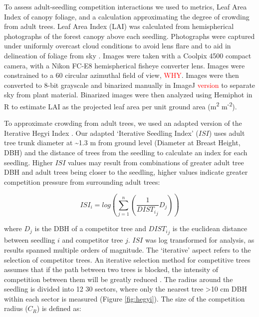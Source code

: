 \documentclass[a4paper,11pt]{article}
\newcommand{\todo}[1]{\textcolor{red}{#1}}   %
\begin{document}
To assess adult-seedling competition interactions we used to metrics, Leaf Area Index of canopy foliage, and a calculation approximating the degree of crowding from adult trees. Leaf Area Index (LAI) was calculated from hemispherical photographs of the forest canopy above each seedling. Photographs were captured under uniformly overcast cloud conditions to avoid lens flare and to aid in delineation of foliage from sky \citep{Frazer2001}. Images were taken with a Coolpix 4500 compact camera, with a Nikon FC-E8 hemispherical fisheye converter lens. Images were constrained to a 60\textdegree{} circular azimuthal field of view, \todo{WHY}. Images were then converted to 8-bit grayscale and binarized manually in ImageJ \todo{version} \citep{} to separate sky from plant material. Binarized images were then analyzed using Hemiphot \citep{} in R to estimate LAI as the projected leaf area per unit ground area (m\textsuperscript{2} m\textsuperscript{-2}).

To approximate crowding from adult trees, we used an adapted version of the Iterative Hegyi Index \citep{Hegyi1974, Lee2004, Seifert2014}. Our adapted `Iterative Seedling Index' ($ISI$) uses adult tree trunk diameter at \textasciitilde{}1.3 m from ground level (Diameter at Breast Height, DBH) and the distance of trees from the seedling to calculate an index for each seedling. Higher $ISI$ values may result from combinations of  greater adult tree DBH and adult trees being closer to the seedling, higher values indicate greater competition pressure from surrounding adult trees:

\begin{equation}
\label{eq:ISI}
ISI_i = log(\sum_{j=1}^n (\frac{1}{{DIST_i}_j} D_j))
\end{equation}

where $D_j$ is the DBH of a competitor tree and ${{DIST_i}_j}$ is the euclidean distance between seedling $i$ and competitor tree $j$. $ISI$ was log transformed for analysis, as results spanned multiple orders of magnitude. The `iterative' aspect refers to the selection of competitor trees. An iterative selection method for competitive trees assumes that if the path between two trees is blocked, the intensity of competition between them will be greatly reduced \citep{Gadow1999}. The radius around the seedling is divided into 12 30\textdegree{} sectors, where only the nearest tree \textgreater{}10 cm DBH within each sector is measured (Figure \ref{fig:hegyi}). The size of the competition radius ($C_R$) is defined as:
\end{document}
